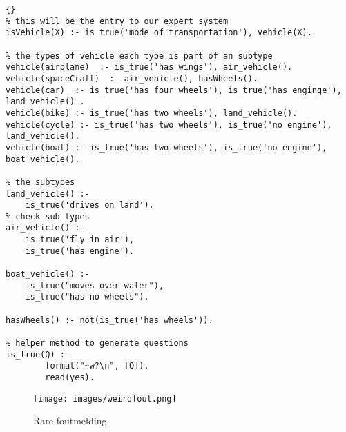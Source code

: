 \begin{lstlisting}{}
% this will be the entry to our expert system
isVehicle(X) :- is_true('mode of transportation'), vehicle(X).

% the types of vehicle each type is part of an subtype
vehicle(airplane)  :- is_true('has wings'), air_vehicle().
vehicle(spaceCraft)  :- air_vehicle(), hasWheels().
vehicle(car)  :- is_true('has four wheels'), is_true('has enginge'), land_vehicle() .
vehicle(bike) :- is_true('has two wheels'), land_vehicle().
vehicle(cycle) :- is_true('has two wheels'), is_true('no engine'), land_vehicle().
vehicle(boat) :- is_true('has two wheels'), is_true('no engine'), boat_vehicle().

% the subtypes 
land_vehicle() :-
	is_true('drives on land').
% check sub types
air_vehicle() :-
	is_true('fly in air'), 
	is_true('has engine').

boat_vehicle() :-
	is_true("moves over water"),
    is_true("has no wheels").

hasWheels() :- not(is_true('has wheels')).

% helper method to generate questions
is_true(Q) :-
        format("~w?\n", [Q]),
        read(yes).
\end{lstlisting}

\begin{figure}[!h]
    \centering
    \texttt{[image: images/weirdfout.png]}
    \caption{Rare foutmelding}
    \label{fig:rareFout}
\end{figure}{}
